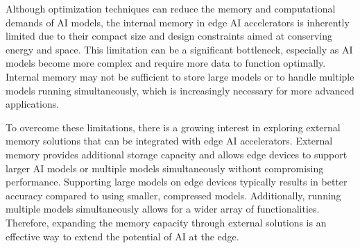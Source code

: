 Although optimization techniques can reduce the memory and computational demands of AI models, the internal memory in edge AI accelerators is inherently limited due to their compact size and design constraints aimed at conserving energy and space.
This limitation can be a significant bottleneck, especially as AI models become more complex and require more data to function optimally.
Internal memory may not be sufficient to store large models or to handle multiple models running simultaneously, which is increasingly necessary for more advanced applications.

To overcome these limitations, there is a growing interest in exploring external memory solutions that can be integrated with edge AI accelerators.
External memory provides additional storage capacity and allows edge devices to support larger AI models or multiple models simultaneously without compromising performance.
Supporting large models on edge devices typically results in better accuracy compared to using smaller, compressed models. Additionally, running multiple models simultaneously allows for a wider array of functionalities.
Therefore, expanding the memory capacity through external solutions is an effective way to extend the potential of AI at the edge.